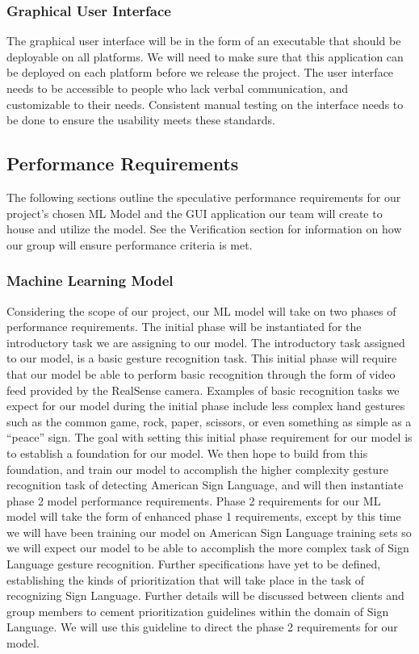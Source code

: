 \documentclass[onecolumn, draftclsnofoot,10pt, compsoc]{IEEEtran}
\begin{document}
\subsubsection{Graphical User Interface}
The graphical user interface will be in the form of an executable that should be deployable on all platforms. We will need to make sure that this application can be deployed on each platform before we release the project. The user interface needs to be accessible to people who lack verbal communication, and customizable to their needs. Consistent manual testing on the interface needs to be done to ensure the usability meets these standards.

\subsection{Performance Requirements}
The following sections outline the speculative performance requirements for our project’s chosen ML Model and the GUI application our team will create to house and utilize the model. See the Verification section for information on how our group will ensure performance criteria is met.
\subsubsection{Machine Learning Model}
Considering the scope of our project, our ML model will take on two phases of performance requirements. The initial phase will be instantiated for the introductory task we are assigning to our model. The introductory task assigned to our model, is a basic gesture recognition task. This initial phase will require that our model be able to perform basic recognition through the form of video feed provided by the RealSense camera. Examples of basic recognition tasks we expect for our model during the initial phase include less complex hand gestures such as the common game, rock, paper, scissors, or even something as simple as a “peace” sign. The goal with setting this initial phase requirement for our model is to establish a foundation for our model. We then hope to build from this foundation, and train our model to accomplish the higher complexity gesture recognition task of detecting American Sign Language, and will then instantiate phase 2 model performance requirements.
\newline \newline
Phase 2 requirements for our ML model will take the form of enhanced phase 1 requirements, except by this time we will have been training our model on American Sign Language training sets so we will expect our model to be able to accomplish the more complex task of Sign Language gesture recognition. Further specifications have yet to be defined, establishing the kinds of prioritization that will take place in the task of recognizing Sign Language. Further details will be discussed between clients and group members to cement prioritization guidelines within the domain of Sign Language. We will use this guideline to direct the phase 2 requirements for our model.
\newline
\end{document}
